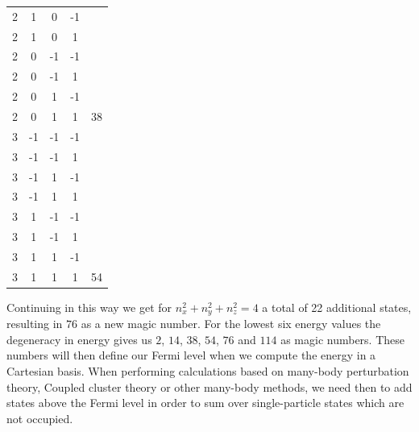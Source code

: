 \begin{table}
\begin{center}
\begin{tabular}{ccccc}
2                               & 1       & 0       & -1      &                            \\
2                               & 1       & 0       & 1       &                            \\
2                               & 0       & -1      & -1      &                            \\
2                               & 0       & -1      & 1       &                            \\
2                               & 0       & 1       & -1      &                            \\
2                               & 0       & 1       & 1       & 38                         \\
\hline
3                               & -1      & -1      & -1      &                            \\
3                               & -1      & -1      & 1       &                            \\
3                               & -1      & 1       & -1      &                            \\
3                               & -1      & 1       & 1       &                            \\
3                               & 1       & -1      & -1      &                            \\
3                               & 1       & -1      & 1       &                            \\
3                               & 1       & 1       & -1      &                            \\
3                               & 1       & 1       & 1       & 54                         \\
\hline
\end{tabular}
\end{center}
\end{table}


Continuing in this way we get for $n_{x}^{2}+n_{y}^{2}+n_{z}^{2}=4$ a
total of 22 additional states, resulting in $76$ as a new magic
number. For the lowest six energy values the degeneracy in energy
gives us $2$, $14$, $38$, $54$, $76$ and $114$ as magic numbers. These
numbers will then define our Fermi level when we compute the energy in
a Cartesian basis. When performing calculations based on many-body
perturbation theory, Coupled cluster theory or other many-body
methods, we need then to add states above the Fermi level in order to
sum over single-particle states which are not occupied.

